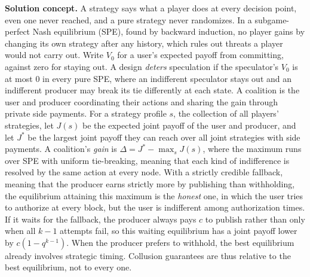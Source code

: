 \documentclass[11pt]{article}
\begin{document}
\textbf{Solution concept.} A strategy says what a player does at every decision point, even one never reached, and a pure strategy never randomizes. In a subgame-perfect Nash equilibrium (SPE), found by backward induction, no player gains by changing its own strategy after any history, which rules out threats a player would not carry out. Write $V_0$ for a user's expected payoff from committing, against zero for staying out. A design \emph{deters} speculation if the speculator's $V_0$ is at most $0$ in every pure SPE, where an indifferent speculator stays out and an indifferent producer may break its tie differently at each state. A coalition is the user and producer coordinating their actions and sharing the gain through private side payments. For a strategy profile $s$, the collection of all players' strategies, let $J(s)$ be the expected joint payoff of the user and producer, and let $J^*$ be the largest joint payoff they can reach over all joint strategies with side payments. A coalition's \emph{gain} is $\Delta=J^*-\max_s J(s)$, where the maximum runs over SPE with uniform tie-breaking, meaning that each kind of indifference is resolved by the same action at every node. With a strictly credible fallback, meaning that the producer earns strictly more by publishing than withholding, the equilibrium attaining this maximum is the \emph{honest} one, in which the user tries to authorize at every block, but the user is indifferent among authorization times. If it waits for the fallback, the producer always pays $c$ to publish rather than only when all $k-1$ attempts fail, so this waiting equilibrium has a joint payoff lower by $c(1-q^{k-1})$. When the producer prefers to withhold, the best equilibrium already involves strategic timing. Collusion guarantees are thus relative to the best equilibrium, not to every one.
\end{document}

